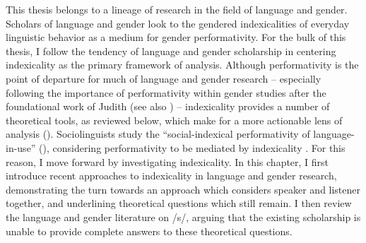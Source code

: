\documentclass[12pt,twoside]{reedthesis}
\begin{document}
This thesis belongs to a lineage of research in the field of language and gender. Scholars of language and gender look to the gendered indexicalities of everyday linguistic behavior as a medium for gender performativity. For the bulk of this thesis, I follow the tendency of language and gender scholarship in centering indexicality as the primary framework of analysis. Although performativity is the point of departure for much of language and gender research -- especially following the importance of performativity within gender studies after the foundational work of Judith \textcite{butler_gender_1990} (see also \cite{bucholtz_feminist_2014}) -- indexicality provides a number of theoretical tools, as reviewed below, which make for a more actionable lens of analysis (\cite{henry_performative_2025}). Sociolinguists study the ``social-indexical performativity of language-in-use'' (\cite[p. 17]{silverstein_language_2023}), considering performativity to be mediated by indexicality \parencite{henry_performative_2025}. For this reason, I move forward by investigating indexicality. In this chapter, I first introduce recent approaches to indexicality in language and gender research, demonstrating the turn towards an approach which considers speaker and listener together, and underlining theoretical questions which still remain. I then review the language and gender literature on /s/, arguing that the existing scholarship is unable to provide complete answers to these theoretical questions.

	
\end{document}
